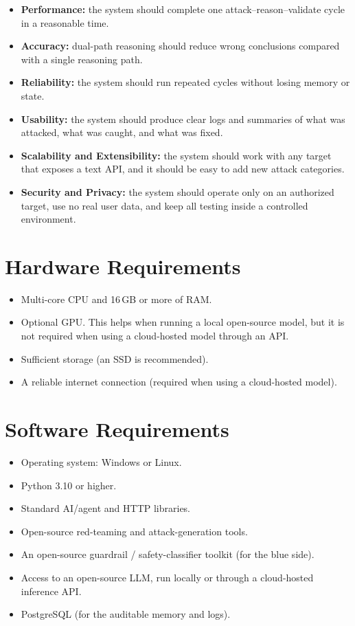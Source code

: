 \begin{itemize}
  \item \textbf{Performance:} the system should complete one
  attack--reason--validate cycle in a reasonable time.
  \item \textbf{Accuracy:} dual-path reasoning should reduce wrong conclusions
  compared with a single reasoning path.
  \item \textbf{Reliability:} the system should run repeated cycles without
  losing memory or state.
  \item \textbf{Usability:} the system should produce clear logs and summaries of
  what was attacked, what was caught, and what was fixed.
  \item \textbf{Scalability and Extensibility:} the system should work with any
  target that exposes a text API, and it should be easy to add new attack
  categories.
  \item \textbf{Security and Privacy:} the system should operate only on an
  authorized target, use no real user data, and keep all testing inside a
  controlled environment.
\end{itemize}

\section{Hardware Requirements}

\begin{itemize}
  \item Multi-core CPU and 16\,GB or more of RAM.
  \item Optional GPU. This helps when running a local open-source model, but it
  is not required when using a cloud-hosted model through an API.
  \item Sufficient storage (an SSD is recommended).
  \item A reliable internet connection (required when using a cloud-hosted
  model).
\end{itemize}

\section{Software Requirements}

\begin{itemize}
  \item Operating system: Windows or Linux.
  \item Python 3.10 or higher.
  \item Standard AI/agent and HTTP libraries.
  \item Open-source red-teaming and attack-generation tools.
  \item An open-source guardrail / safety-classifier toolkit (for the blue side).
  \item Access to an open-source LLM, run locally or through a cloud-hosted
  inference API.
  \item PostgreSQL (for the auditable memory and logs).
\end{itemize}


